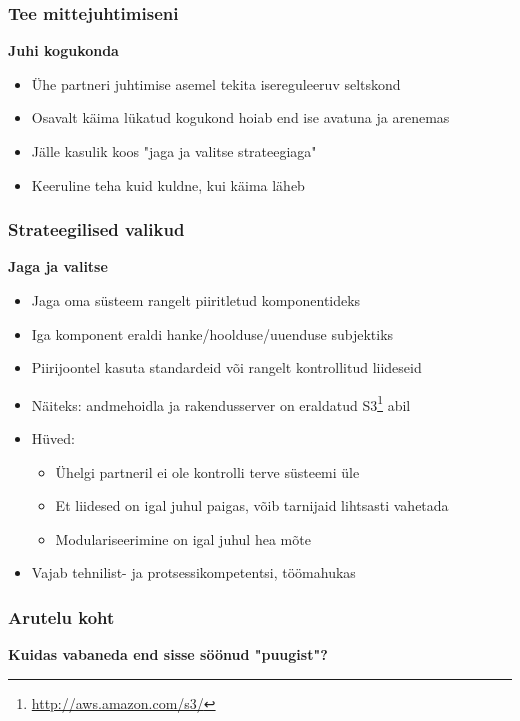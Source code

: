 \begin{frame}[fragile]
  \frametitle{Tee mittejuhtimiseni}
	\textbf{	Juhi kogukonda}
	\begin{itemize}
		\item Ühe partneri juhtimise asemel tekita isereguleeruv seltskond 
		\item Osavalt käima lükatud kogukond hoiab end ise avatuna ja arenemas
		\item Jälle kasulik koos "jaga ja valitse strateegiaga"
		\item Keeruline teha kuid kuldne, kui käima läheb
	\end{itemize}
\end{frame}

\begin{frame}[fragile]
  \frametitle{Strateegilised valikud}
	\textbf{	Jaga ja valitse}
	\begin{itemize}
		\item Jaga oma süsteem rangelt piiritletud komponentideks 
		\item Iga komponent eraldi hanke/hoolduse/uuenduse subjektiks
		\item Piirijoontel kasuta standardeid või rangelt kontrollitud liideseid
		\item Näiteks: andmehoidla ja rakendusserver on eraldatud S3\footnote{\url{http://aws.amazon.com/s3/}} abil
		\item Hüved:
		\begin{itemize}
			\item Ühelgi partneril ei ole kontrolli terve süsteemi üle
			\item Et liidesed on igal juhul paigas, võib tarnijaid lihtsasti vahetada
			\item Modulariseerimine on igal juhul hea mõte
		\end{itemize}
		\item Vajab tehnilist- ja protsessikompetentsi, töömahukas
	\end{itemize}
\end{frame}


\begin{frame}[fragile]
  \frametitle{Arutelu koht}
		\begin{center}
			\textbf{Kuidas vabaneda end sisse söönud "puugist"?}
		\end{center}
\end{frame}


